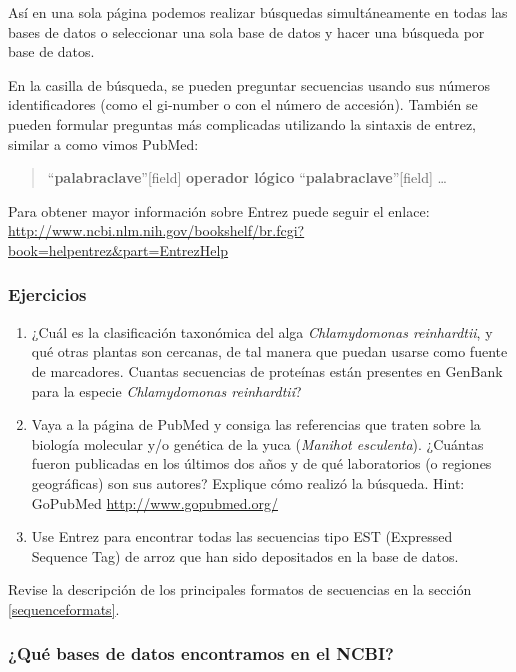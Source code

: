 \documentclass[letter,11pt]{book}
\begin{document}
Así en una sola página podemos realizar búsquedas simultáneamente en todas las bases de datos o seleccionar una sola base de datos y hacer una búsqueda por base de datos.

En la casilla de búsqueda, se pueden preguntar secuencias usando sus números identificadores (como el gi-number o con el número de accesión).  También se pueden formular preguntas más complicadas utilizando la sintaxis de entrez, similar a como vimos PubMed: 

\begin{quote}
``\textbf{palabraclave}''[field] \textbf{operador lógico} ``\textbf{palabraclave}''[field] \ldots
\end{quote}

Para obtener mayor información sobre Entrez puede seguir el enlace: 
\url{http://www.ncbi.nlm.nih.gov/bookshelf/br.fcgi?book=helpentrez&part=EntrezHelp}

{\color{red}
\subsubsection{Ejercicios}

\begin{enumerate}
\item ¿Cuál es la clasificación taxonómica del alga \textit{Chlamydomonas reinhardtii}, y qué otras plantas son cercanas, de tal manera que puedan usarse como fuente de marcadores. Cuantas secuencias de proteínas están presentes en GenBank para la especie \textit{Chlamydomonas reinhardtii}?
\item Vaya a la página de PubMed y consiga las referencias que traten sobre la biología molecular y/o genética de la yuca (\textit{Manihot esculenta}).  ¿Cuántas fueron publicadas en  los últimos dos años y de qué laboratorios (o regiones geográficas) son sus autores? Explique cómo realizó la búsqueda. Hint: GoPubMed \url{http://www.gopubmed.org/}
\item Use Entrez para encontrar todas las secuencias tipo EST (Expressed Sequence Tag) de arroz que han sido depositados en la base de datos.
\end{enumerate}
}

Revise la descripción de los principales formatos de secuencias en la sección \ref{sequenceformats}.

\subsubsection{¿Qué bases de datos encontramos en el NCBI?}
\end{document}
